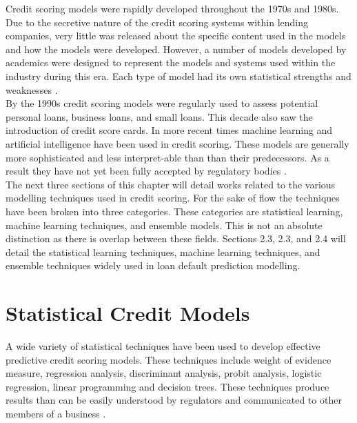 Credit scoring models were rapidly developed throughout the 1970s and 1980s. Due to the secretive nature of the credit scoring systems within lending companies, very little was released about the specific content used in the models and how the models were developed.   However, a number of models developed by academics were designed to represent the models and systems used within the industry during this era. Each type of model had its own statistical strengths and weaknesses \parencite{CreditScoringReadings}. \\

By the 1990s credit scoring models were regularly used to assess potential personal loans, business loans, and small loans. This decade also saw the introduction of credit score cards. In more recent times machine learning and artificial intelligence have been used in credit scoring. These models are generally more sophisticated and less interpret-able than than their predecessors. As a result they have not yet been fully accepted by regulatory bodies \parencite{CreditScoringTechniquesOverview}. \\

The next three sections of this chapter will detail works related to the various modelling techniques used in credit scoring. For the sake of flow the techniques have been broken into three categories. These categories are statistical learning, machine learning techniques, and ensemble models. This is not an absolute distinction as there is overlap between these fields. Sections 2.3, 2.3, and 2.4 will detail the statistical learning techniques, machine learning techniques, and ensemble techniques widely used in loan default prediction modelling. 


\section{Statistical Credit Models}

A wide variety of statistical techniques have been used to develop effective predictive credit scoring models. These techniques include weight of evidence measure, regression analysis, discriminant analysis, probit analysis, logistic regression, linear programming and decision trees. These techniques produce results than can be easily understood by regulators and communicated to other members of a business \parencite{CreditScoringTechniquesLitReview}. 

